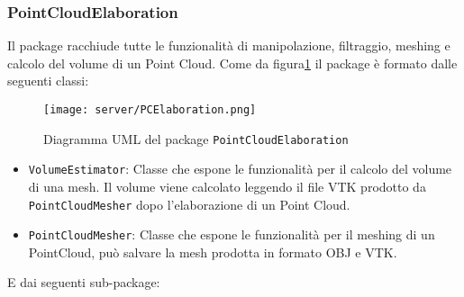 \subsubsection{PointCloudElaboration}
Il package racchiude tutte le funzionalità di manipolazione, filtraggio, meshing e calcolo del volume di un Point Cloud. 
Come da figura\ref{fig:PCElaboration} il package è formato dalle seguenti classi:
\begin{figure}[!h] 
    \centering 
    \texttt{[image: server/PCElaboration.png]} 
    \caption{Diagramma UML del package \texttt{PointCloudElaboration}}
   \label{fig:PCElaboration}
\end{figure}
\begin{itemize}
\item\texttt{VolumeEstimator}: Classe che espone le funzionalità per il calcolo del volume di una mesh. Il volume viene calcolato leggendo il file VTK prodotto da \texttt{PointCloudMesher} dopo l'elaborazione di un Point Cloud.
\item\texttt{PointCloudMesher}: Classe che espone le funzionalità per il meshing di un PointCloud, può salvare la mesh prodotta in formato OBJ e VTK.
\end{itemize}
E dai seguenti sub-package:

